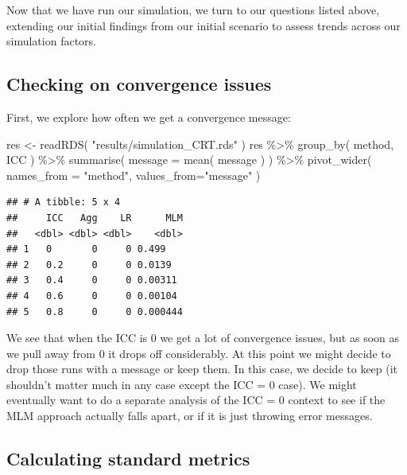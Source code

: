 \documentclass[
]{book}
\newenvironment{Shaded}{\begin{snugshade}}{\end{snugshade}}
\newcommand{\AttributeTok}[1]{\textcolor[rgb]{0.77,0.63,0.00}{#1}}
\newcommand{\FunctionTok}[1]{\textcolor[rgb]{0.00,0.00,0.00}{#1}}
\newcommand{\NormalTok}[1]{#1}
\newcommand{\OtherTok}[1]{\textcolor[rgb]{0.56,0.35,0.01}{#1}}
\newcommand{\SpecialCharTok}[1]{\textcolor[rgb]{0.00,0.00,0.00}{#1}}
\newcommand{\StringTok}[1]{\textcolor[rgb]{0.31,0.60,0.02}{#1}}
\begin{document}
Now that we have run our simulation, we turn to our questions listed above, extending our initial findings from our initial scenario to assess trends across our simulation factors.

\hypertarget{checking-on-convergence-issues}{%
\subsection{Checking on convergence issues}\label{checking-on-convergence-issues}}

First, we explore how often we get a convergence message:

\begin{Shaded}
\begin{Highlighting}[]
\NormalTok{res }\OtherTok{\textless{}{-}} \FunctionTok{readRDS}\NormalTok{( }\StringTok{"results/simulation\_CRT.rds"}\NormalTok{ )}
\NormalTok{res }\SpecialCharTok{\%\textgreater{}\%} 
  \FunctionTok{group\_by}\NormalTok{( method, ICC ) }\SpecialCharTok{\%\textgreater{}\%}
  \FunctionTok{summarise}\NormalTok{( }\AttributeTok{message =} \FunctionTok{mean}\NormalTok{( message ) ) }\SpecialCharTok{\%\textgreater{}\%}
  \FunctionTok{pivot\_wider}\NormalTok{( }\AttributeTok{names\_from =} \StringTok{"method"}\NormalTok{, }\AttributeTok{values\_from=}\StringTok{"message"}\NormalTok{ )}
\end{Highlighting}
\end{Shaded}

\begin{verbatim}
## # A tibble: 5 x 4
##     ICC   Agg    LR      MLM
##   <dbl> <dbl> <dbl>    <dbl>
## 1   0       0     0 0.499   
## 2   0.2     0     0 0.0139  
## 3   0.4     0     0 0.00311 
## 4   0.6     0     0 0.00104 
## 5   0.8     0     0 0.000444
\end{verbatim}

We see that when the ICC is 0 we get a lot of convergence issues, but as soon as we pull away from 0 it drops off considerably.
At this point we might decide to drop those runs with a message or keep them.
In this case, we decide to keep (it shouldn't matter much in any case except the ICC = 0 case).
We might eventually want to do a separate analysis of the ICC = 0 context to see if the MLM approach actually falls apart, or if it is just throwing error messages.

\hypertarget{calculating-standard-metrics}{%
\subsection{Calculating standard metrics}\label{calculating-standard-metrics}}
\end{document}
